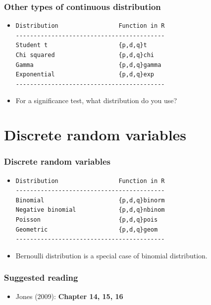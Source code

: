 \documentclass[10pt]{beamer}
\begin{document}
\begin{frame}[fragile]
  \frametitle{Other types of continuous distribution}

\begin{itemize}
\item

\begin{verbatim}
Distribution                 Function in R
------------------------------------------
Student t                    {p,d,q}t
Chi squared                  {p,d,q}chi
Gamma                        {p,d,q}gamma
Exponential                  {p,d,q}exp
------------------------------------------
\end{verbatim}

\item For a significance test, what distribution do you use?

\end{itemize}
\end{frame}

\section{Discrete random variables}

\begin{frame}[fragile]
\frametitle{Discrete random variables}
\begin{itemize}
\item

\begin{verbatim}
Distribution                 Function in R
------------------------------------------
Binomial                     {p,d,q}binorm
Negative binomial            {p,d,q}nbinom
Poisson                      {p,d,q}pois
Geometric                    {p,d,q}geom
------------------------------------------
\end{verbatim}

\item Bernoulli distribution is a special case of binomial distribution.

\end{itemize}
\end{frame}

\begin{frame}
  \frametitle{Suggested reading}

  \begin{itemize}
  \item Jones (2009): \textbf{Chapter 14, 15, 16}
  \end{itemize}

\end{frame}
\end{document}
